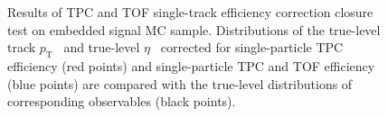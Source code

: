 \begin{figure}[h]
{\begin{subfigure}[b]{\linewidth}
  \end{subfigure}
}%
\caption[Results of TPC and TOF single-track efficiency correction closure test on embedded signal MC sample.]{Results of TPC and TOF single-track efficiency correction closure test on embedded signal MC sample. Distributions of the true-level track $p_{\text{T}}$~ and true-level $\eta$~ corrected for single-particle TPC efficiency (red points) and single-particle TPC and TOF efficiency (blue points) are compared with the true-level distributions of corresponding observables (black points). }\label{fig:closureTestTpcTofSingleTrk}%
\end{figure}
\begin{figure}[h]
\centering
\parbox{0.4725\textwidth}{
  \centering
  \begin{subfigure}[b]{\linewidth}
  \end{subfigure}\\
  \begin{subfigure}[b]{\linewidth}\addtocounter{subfigure}{1}

\end{subfigure}}
\end{figure}
